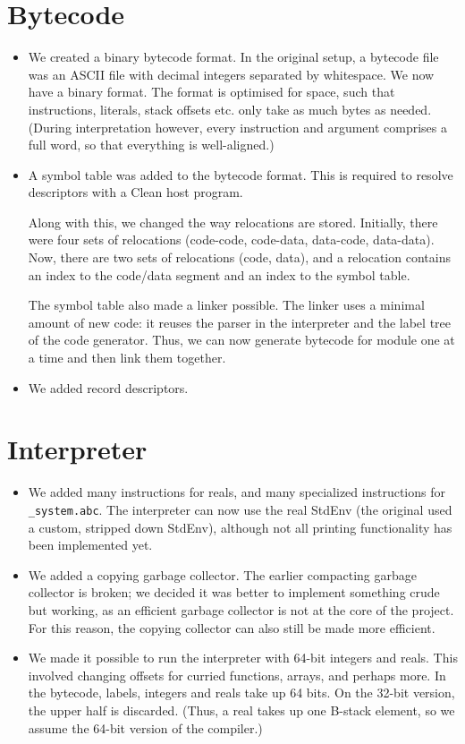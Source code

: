 \documentclass[a4paper]{article}
\begin{document}
\section*{Bytecode}
\begin{itemize}
	\item
		We created a binary bytecode format.
		In the original setup, a bytecode file was an ASCII file with decimal integers separated by whitespace.
		We now have a binary format.
		The format is optimised for space, such that instructions, literals, stack offsets etc. only take as much bytes as needed.
		(During interpretation however, every instruction and argument comprises a full word, so that everything is well-aligned.)

	\item
		A symbol table was added to the bytecode format.
		This is required to resolve descriptors with a Clean host program.

		Along with this, we changed the way relocations are stored.
		Initially, there were four sets of relocations (code-code, code-data, data-code, data-data).
		Now, there are two sets of relocations (code, data), and a relocation contains an index to the code/data segment and an index to the symbol table.

		The symbol table also made a linker possible.
		The linker uses a minimal amount of new code:
			it reuses the parser in the interpreter and the label tree of the code generator.
		Thus, we can now generate bytecode for module one at a time and then link them together.

	\item
		We added record descriptors.
\end{itemize}

\section*{Interpreter}
\begin{itemize}
	\item
		We added many instructions for reals, and many specialized instructions for \texttt{\_system.abc}.
		The interpreter can now use the real StdEnv (the original used a custom, stripped down StdEnv), although not all printing functionality has been implemented yet.

	\item
		We added a copying garbage collector.
		The earlier compacting garbage collector is broken; we decided it was better to implement something crude but working,
			as an efficient garbage collector is not at the core of the project.
		For this reason, the copying collector can also still be made more efficient.

	\item
		We made it possible to run the interpreter with 64-bit integers and reals.
		This involved changing offsets for curried functions, arrays, and perhaps more.
		In the bytecode, labels, integers and reals take up 64 bits.
		On the 32-bit version, the upper half is discarded.
		(Thus, a real takes up one B-stack element, so we assume the 64-bit version of the compiler.)
\end{itemize}
\end{document}
